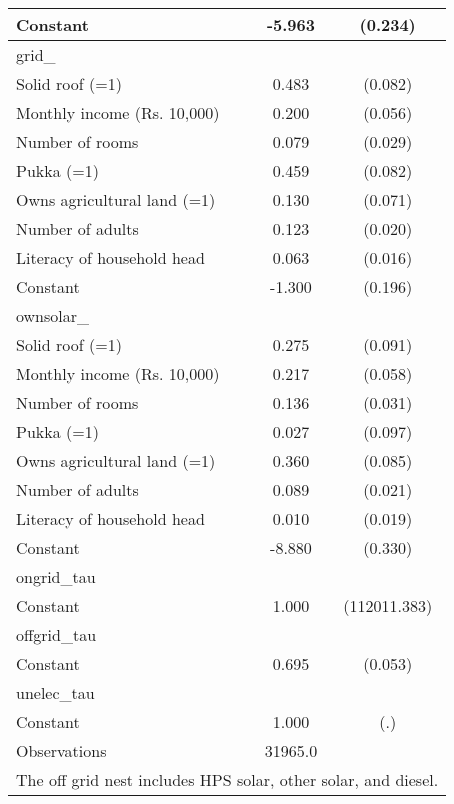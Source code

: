 \begin{table}[htbp]
{\begin{tabular}{l*{1}{cc}}
Constant            &      -5.963\sym{***}&     (0.234)\\
\midrule
grid\_               &                     &            \\
Solid roof (=1)     &       0.483\sym{***}&     (0.082)\\
Monthly income (Rs. 10,000)&       0.200\sym{***}&     (0.056)\\
Number of rooms     &       0.079\sym{***}&     (0.029)\\
Pukka (=1)          &       0.459\sym{***}&     (0.082)\\
Owns agricultural land (=1)&       0.130\sym{*}  &     (0.071)\\
Number of adults    &       0.123\sym{***}&     (0.020)\\
Literacy of household head&       0.063\sym{***}&     (0.016)\\
Constant            &      -1.300\sym{***}&     (0.196)\\
\midrule
ownsolar\_           &                     &            \\
Solid roof (=1)     &       0.275\sym{***}&     (0.091)\\
Monthly income (Rs. 10,000)&       0.217\sym{***}&     (0.058)\\
Number of rooms     &       0.136\sym{***}&     (0.031)\\
Pukka (=1)          &       0.027         &     (0.097)\\
Owns agricultural land (=1)&       0.360\sym{***}&     (0.085)\\
Number of adults    &       0.089\sym{***}&     (0.021)\\
Literacy of household head&       0.010         &     (0.019)\\
Constant            &      -8.880\sym{***}&     (0.330)\\
\midrule
ongrid\_tau          &                     &            \\
Constant            &       1.000         &(112011.383)\\
\midrule
offgrid\_tau         &                     &            \\
Constant            &       0.695\sym{***}&     (0.053)\\
\midrule
unelec\_tau          &                     &            \\
Constant            &       1.000         &         (.)\\
\midrule
Observations        &     31965.0         &            \\
\bottomrule
\multicolumn{3}{l}{\footnotesize The off grid nest includes HPS solar, other solar, and diesel.}\\
\end{tabular}}
\end{table}
